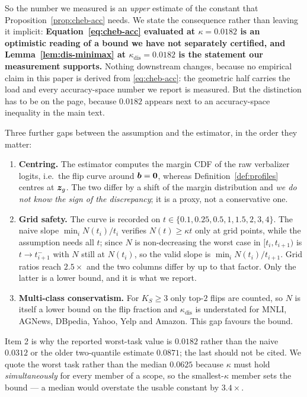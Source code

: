 \noindent So the number we measured is an \emph{upper} estimate of the constant that
Proposition~\ref{prop:cheb-acc} needs. We state the consequence rather than leaving
it implicit: \textbf{Equation~\eqref{eq:cheb-acc} evaluated at
$\kappa=0.0182$ is an optimistic reading of a bound we have not separately
certified, and Lemma~\ref{lem:dis-minimax} at
$\kappa_{\mathrm{dis}}=0.0182$ is the statement our measurement supports.} Nothing
downstream changes, because no empirical claim in this paper is derived from
\eqref{eq:cheb-acc}: the geometric half carries the load and every accuracy-space
number we report is measured. But the distinction has to be on the page, because
$0.0182$ appears next to an accuracy-space inequality in the main text.

Three further gaps between the assumption and the estimator, in the order they
matter:

\begin{enumerate}
  \item \textbf{Centring.} The estimator computes the margin CDF of the raw
    verbalizer logits, i.e.\ the flip curve around $\bm{b}=\mathbf{0}$, whereas
    Definition~\ref{def:profiles} centres at $\bm{z}_g$. The two differ by a shift of
    the margin distribution and \emph{we do not know the sign of the discrepancy};
    it is a proxy, not a conservative one.
  \item \textbf{Grid safety.} The curve is recorded on
    $t\in\{0.1,0.25,0.5,1,1.5,2,3,4\}$. The naive slope $\min_i N(t_i)/t_i$
    verifies $N(t)\ge\kappa t$ only at grid points, while the assumption needs all
    $t$; since $N$ is non-decreasing the worst case in $[t_i,t_{i+1})$ is
    $t\to t_{i+1}^-$ with $N$ still at $N(t_i)$, so the valid slope is
    $\min_i N(t_i)/t_{i+1}$. Grid ratios reach $2.5\times$ and the two columns
    differ by up to that factor. Only the latter is a lower bound, and it is what
    we report.
  \item \textbf{Multi-class conservatism.} For $K_S\ge3$ only top-$2$ flips are
    counted, so $N$ is itself a lower bound on the flip fraction and
    $\kappa_{\mathrm{dis}}$ is understated for MNLI, AGNews, DBpedia, Yahoo, Yelp
    and Amazon. This gap favours the bound.
\end{enumerate}

\noindent Item 2 is why the reported worst-task value is $0.0182$ rather than the
naive $0.0312$ or the older two-quantile estimate $0.0871$; the last should not be
cited. We quote the worst task rather than the median $0.0625$ because $\kappa$ must
hold \emph{simultaneously} for every member of a scope, so the smallest-$\kappa$
member sets the bound --- a median would overstate the usable constant by
$3.4\times$.

